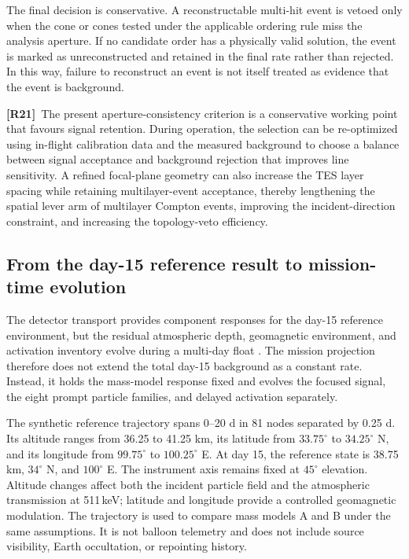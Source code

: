 \documentclass[11pt]{article}
\newcommand{\revmark}[1]{\textcolor{revisionblue}{\textbf{[R#1]}}\ }
\newcommand{\revblue}[1]{\textcolor{revisionblue}{#1}}
\begin{document}
The final decision is conservative. A reconstructable multi-hit event is vetoed
only when the cone or cones tested under the applicable ordering rule miss the
analysis aperture. If no candidate order has a physically valid solution, the
event is marked as unreconstructed and retained in the final rate rather than
rejected. In this way, failure to reconstruct an event is not itself treated as
evidence that the event is background.

\revmark{21}\revblue{The present aperture-consistency criterion is a conservative working point that favours signal retention. During operation, the selection can be re-optimized using in-flight calibration data and the measured background to choose a balance between signal acceptance and background rejection that improves line sensitivity. A refined focal-plane geometry can also increase the TES layer spacing while retaining multilayer-event acceptance, thereby lengthening the spatial lever arm of multilayer Compton events, improving the incident-direction constraint, and increasing the topology-veto efficiency.}

\subsection{From the day-15 reference result to mission-time evolution}
\label{sec:mission_time_fold}

The detector transport provides component responses for the day-15 reference
environment, but the residual atmospheric depth, geomagnetic environment, and
activation inventory evolve during a multi-day float
\cite{Gallego2025Balloon,Kierans2017}. The mission projection therefore does not
extend the total day-15 background as a constant rate. Instead, it holds the
mass-model response fixed and evolves the focused signal, the eight prompt
particle families, and delayed activation separately.

The synthetic reference trajectory spans 0--20 d in 81 nodes separated by
0.25 d. Its altitude ranges from 36.25 to 41.25 km, its latitude from
$33.75^\circ$ to $34.25^\circ$ N, and its longitude from $99.75^\circ$ to
$100.25^\circ$ E. At day 15, the reference state is 38.75 km,
$34^\circ$ N, and $100^\circ$ E. The instrument axis remains fixed at
$45^\circ$ elevation. Altitude changes affect both the incident
particle field and the atmospheric transmission at 511\,keV; latitude and
longitude provide a controlled geomagnetic modulation. The trajectory is used
to compare mass models A and B under the same assumptions. It is not balloon
telemetry and does not include source visibility, Earth occultation, or
repointing history.
\end{document}
